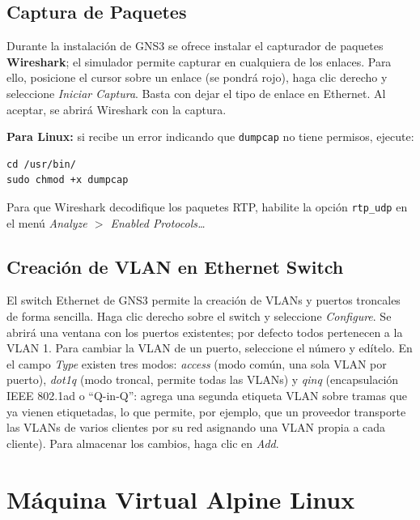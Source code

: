 \documentclass[letterpaper,12pt]{article}
\begin{document}
\subsection{Captura de Paquetes}

Durante la instalación de GNS3 se ofrece instalar el capturador de paquetes \textbf{Wireshark}; el simulador permite capturar en cualquiera de los enlaces. Para ello, posicione el cursor sobre un enlace (se pondrá rojo), haga clic derecho y seleccione \textit{Iniciar Captura}. Basta con dejar el tipo de enlace en Ethernet. Al aceptar, se abrirá Wireshark con la captura.

\begin{nota}
\textbf{Para Linux:} si recibe un error indicando que \texttt{dumpcap} no tiene permisos, ejecute:
\begin{lstlisting}
cd /usr/bin/
sudo chmod +x dumpcap
\end{lstlisting}
\end{nota}

Para que Wireshark decodifique los paquetes RTP, habilite la opción \texttt{rtp\_udp} en el menú \textit{Analyze $>$ Enabled Protocols\ldots}

\subsection{Creación de VLAN en Ethernet Switch}

El switch Ethernet de GNS3 permite la creación de VLANs y puertos troncales de forma sencilla. Haga clic derecho sobre el switch y seleccione \textit{Configure}. Se abrirá una ventana con los puertos existentes; por defecto todos pertenecen a la VLAN 1. Para cambiar la VLAN de un puerto, seleccione el número y edítelo. En el campo \textit{Type} existen tres modos: \textit{access} (modo común, una sola VLAN por puerto), \textit{dot1q} (modo troncal, permite todas las VLANs) y \textit{qinq} (encapsulación IEEE 802.1ad o ``Q-in-Q'': agrega una segunda etiqueta VLAN sobre tramas que ya vienen etiquetadas, lo que permite, por ejemplo, que un proveedor transporte las VLANs de varios clientes por su red asignando una VLAN propia a cada cliente). Para almacenar los cambios, haga clic en \textit{Add}.

\section{Máquina Virtual Alpine Linux}
\end{document}
